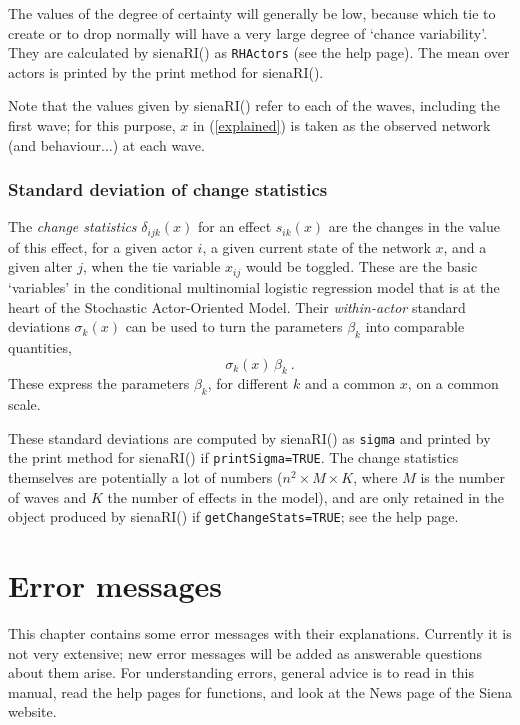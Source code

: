 \documentclass[a4paper,fleqn,11pt]{article}
\newcommand{\+}{\, + \,}
\newcommand{\sfn}[1]{\textsf{#1}}
\newcommand{\saom}{{Stochastic Actor-Oriented Model}}
\begin{document}
The values of the degree of certainty will generally be low, because
which tie to create or to drop normally will have a very large
degree of `chance variability'.
They are calculated by  \sfn{sienaRI()} as \texttt{RHActors}
(see the help page). The mean over actors is printed by the print method
for \sfn{sienaRI()}.

Note that the values given by \sfn{sienaRI()} refer to each of the waves,
including the first wave; for this purpose, $x$ in (\ref{explained})
is taken as the observed network (and behaviour...) at each wave.


\subsubsection{Standard deviation of change statistics}

The  \emph{change statistics} $\delta_{ijk}(x)$
for an effect $s_{ik}(x)$ are the changes in the
value of this effect, for a given actor $i$, a given current state
of the network $x$, and a given alter $j$, when the
tie variable $x_{ij}$ would be toggled.
These are the basic `variables' in the conditional multinomial
logistic regression model that is at the heart of the \saom.
Their \emph{within-actor} standard deviations $\sigma_k(x)$
can be used to turn the parameters $\beta_k$ into
comparable quantities,
\begin{equation}
    \sigma_k(x) \, \beta_k  \ .   \label{standardized.beta}
\end{equation}
These express the parameters $\beta_k$, for different $k$ and a common $x$,
on a common scale.

These standard deviations are computed by \sfn{sienaRI()} as \texttt{sigma}
and  printed by the print method for \sfn{sienaRI()} if \texttt{printSigma=TRUE}.
The change statistics themselves are potentially a lot of numbers
($n^2 \times M \times K$, where $M$ is the number of waves and $K$
the number of effects in the model), and are only retained in the object
produced by \sfn{sienaRI()} if \texttt{getChangeStats=TRUE}; see the help page.

\newpage
\section{Error messages}


This chapter contains some error messages with their explanations.
Currently it is not very  extensive; new error messages will be added
as answerable questions about them arise.
For understanding errors, general advice is to read in this manual,
read the help pages for functions, and look at the News page of the
Siena website.
\medskip
\end{document}
